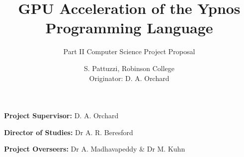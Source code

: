 \documentclass[12pt,a4,parskip=full]{scrartcl}
\begin{document}

\cleardoublepage

\subtitle{Part II Computer Science Project Proposal}
\title{GPU Acceleration of the Ypnos Programming Language}
\author{
S. Pattuzzi, Robinson College\\
Originator: D. A. Orchard
}

\maketitle

\vfill

\noindent
\textbf{Project Supervisor:} D. A. Orchard
\vspace{0.2in}

\noindent
\textbf{Director of Studies:} Dr A. R. Beresford
\vspace{0.2in}
\noindent
 
\noindent
\textbf{Project Overseers:} Dr A. Madhavapeddy \& Dr M. Kuhn


\end{document}
